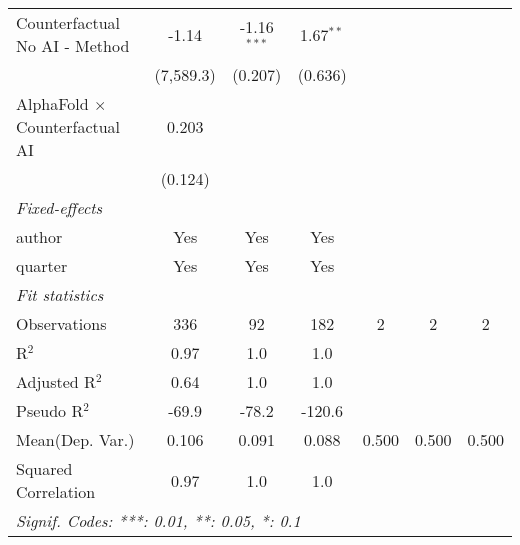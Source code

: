 \begin{tabular}{lcccccc}
   Counterfactual No AI - Method         & -1.14     & -1.16$^{***}$  & 1.67$^{**}$    &     &     &   \\   
                                         & (7,589.3) & (0.207)        & (0.636)        &     &     &   \\   
   AlphaFold $\times$ Counterfactual AI  & 0.203     &                &                &     &     &   \\   
                                         & (0.124)   &                &                &     &     &   \\   
   \midrule
   \emph{Fixed-effects}\\
   author                                & Yes       & Yes            & Yes            &     &     & \\  
   quarter                               & Yes       & Yes            & Yes            &     &     & \\  
   \midrule
   \emph{Fit statistics}\\
   Observations                          & 336       & 92             & 182            & 2   & 2   & 2\\  
   R$^2$                                 & 0.97      & 1.0            & 1.0            &     &     & \\  
   Adjusted R$^2$                        & 0.64      & 1.0            & 1.0            &     &     & \\  
   Pseudo R$^2$                          & -69.9     & -78.2          & -120.6         &     &     & \\  
Mean(Dep. Var.) & 0.106 & 0.091 & 0.088 & 0.500 & 0.500 & 0.500 \\
   Squared Correlation                   & 0.97      & 1.0            & 1.0            &     &     & \\  
   \midrule \midrule
   \multicolumn{7}{l}{\emph{Signif. Codes: ***: 0.01, **: 0.05, *: 0.1}}\\
\end{tabular}
\par\endgroup
